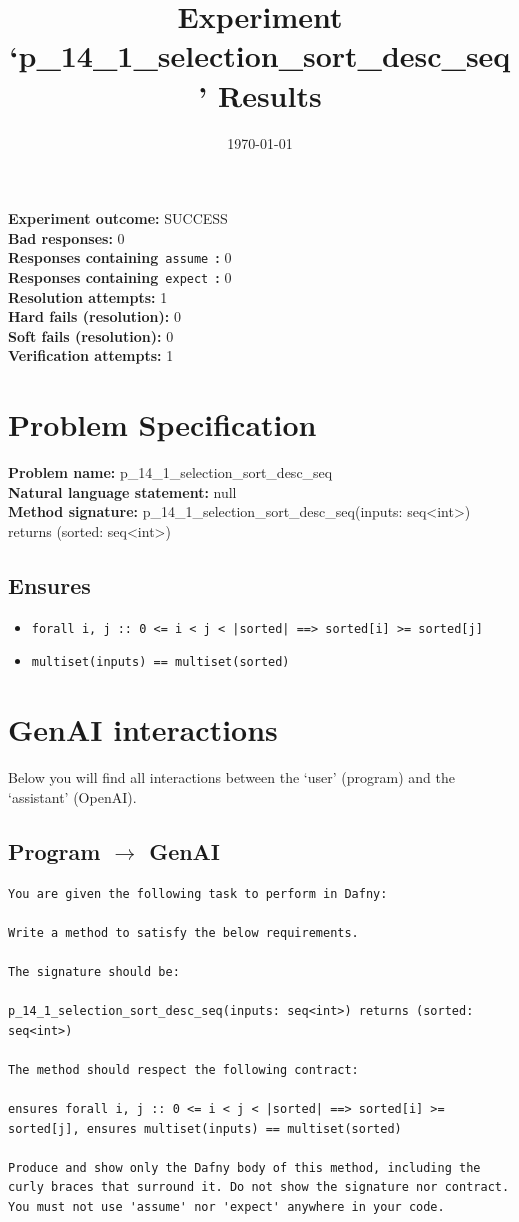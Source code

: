 \documentclass{article}
\begin{document}
\title{Experiment `p\_14\_1\_selection\_sort\_desc\_seq' Results}
\author{\today}
\date{}
\maketitle
\textbf{Experiment outcome: }SUCCESS
\\\textbf{Bad responses: }0
\\\textbf{Responses containing}~\texttt{assume}~\textbf{: }0
\\\textbf{Responses containing}~\texttt{expect}~\textbf{: }0
\\\textbf{Resolution attempts: }1
\\\textbf{Hard fails (resolution): }0
\\\textbf{Soft fails (resolution): }0
\\\textbf{Verification attempts: }1
\section*{Problem Specification}
\textbf{Problem name: }p\_14\_1\_selection\_sort\_desc\_seq
\\\textbf{Natural language statement: }null
\\\textbf{Method signature: }p\_14\_1\_selection\_sort\_desc\_seq(inputs: seq<int>) returns (sorted: seq<int>)
\subsection*{Ensures}
\begin{itemize}
\item \texttt{forall i, j :: 0 <= i < j < |sorted| ==> sorted[i] >= sorted[j]}
\item \texttt{multiset(inputs) == multiset(sorted)}
\end{itemize}
\clearpage
\section*{GenAI interactions}
Below you will find all interactions between the `user' (program) and the `assistant' (OpenAI).
\subsection*{Program $\rightarrow$ GenAI}
\begin{lstlisting}
You are given the following task to perform in Dafny:

Write a method to satisfy the below requirements.

The signature should be:

p_14_1_selection_sort_desc_seq(inputs: seq<int>) returns (sorted: seq<int>)

The method should respect the following contract:

ensures forall i, j :: 0 <= i < j < |sorted| ==> sorted[i] >= sorted[j], ensures multiset(inputs) == multiset(sorted)

Produce and show only the Dafny body of this method, including the curly braces that surround it. Do not show the signature nor contract. You must not use 'assume' nor 'expect' anywhere in your code.
\end{lstlisting}
\end{document}
